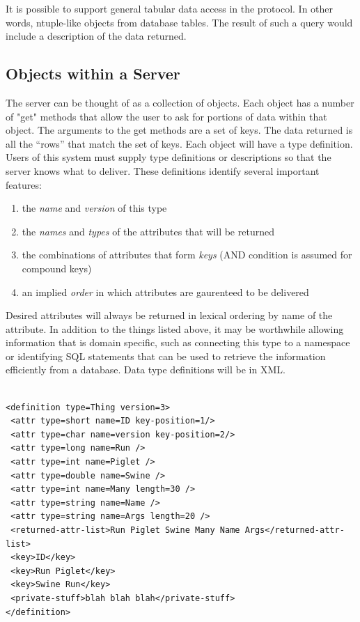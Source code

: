 It is possible to support general tabular data access in the
protocol. In other words, ntuple-like objects from database
tables. The result of such a query would include a description of the
data returned.

\subsection{Objects within a Server}

The server can be thought of as a collection of objects.  Each object has
a number of "get" methods that allow the user to ask for portions of data
within that object.  The arguments to the get methods are a set of keys.
The data returned is all the ``rows'' that match the set of keys.
Each object will have a type definition.  Users of this system must
supply type definitions or descriptions so that the server knows what
to deliver.  These definitions identify several important features:

\begin{enumerate}
\item the \emph{name} and \emph{version} of this type
\item the \emph{names} and \emph{types} of the attributes that will be
returned
\item the combinations of attributes that form \emph{keys} (AND condition
is assumed for compound keys)
\item an implied \emph{order} in which attributes are gaurenteed
to be delivered
\end{enumerate}

Desired attributes will always be returned in lexical ordering by
name of the attribute.
In addition to the things listed above, it may be worthwhile allowing
information that is domain specific, such as connecting this type
to a namespace or identifying SQL statements that can be used to
retrieve the information efficiently from a database.  Data type 
definitions will be in XML.

\begin{verbatim}

<definition type=Thing version=3>
 <attr type=short name=ID key-position=1/>
 <attr type=char name=version key-position=2/>
 <attr type=long name=Run />
 <attr type=int name=Piglet />
 <attr type=double name=Swine />
 <attr type=int name=Many length=30 />
 <attr type=string name=Name />
 <attr type=string name=Args length=20 />
 <returned-attr-list>Run Piglet Swine Many Name Args</returned-attr-list>
 <key>ID</key>
 <key>Run Piglet</key>
 <key>Swine Run</key>
 <private-stuff>blah blah blah</private-stuff>
</definition>

\end{verbatim}

